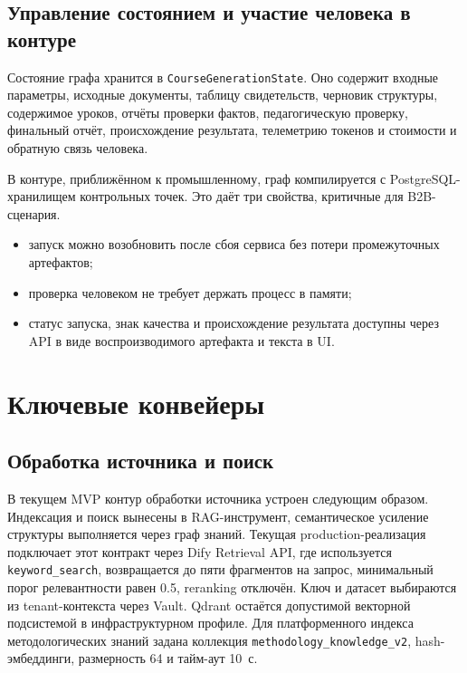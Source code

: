 \subsection{Управление состоянием и участие человека в контуре}

Состояние графа хранится в \texttt{CourseGenerationState}. Оно
содержит входные параметры, исходные документы, таблицу свидетельств,
черновик структуры, содержимое уроков, отчёты проверки фактов,
педагогическую проверку, финальный отчёт, происхождение результата,
телеметрию токенов и стоимости и обратную связь человека.

В контуре, приближённом к промышленному, граф компилируется с PostgreSQL-хранилищем контрольных точек.
Это даёт три свойства, критичные для B2B-сценария.

\begin{itemize}
  \item запуск можно возобновить после сбоя сервиса без потери
    промежуточных артефактов;
  \item проверка человеком не требует держать процесс в памяти;
  \item статус запуска, знак качества и происхождение результата доступны через API
    в виде воспроизводимого артефакта и текста в UI.
\end{itemize}

\section{Ключевые конвейеры}

\subsection{Обработка источника и поиск}

В текущем MVP контур обработки источника устроен следующим образом.
Индексация и поиск вынесены в RAG-инструмент,
семантическое усиление структуры выполняется через граф знаний.
Текущая production-реализация подключает этот контракт через Dify
Retrieval API, где используется \texttt{keyword\_search}, возвращается до
пяти фрагментов на запрос, минимальный порог релевантности равен
0.5, reranking отключён. Ключ и датасет выбираются из tenant-контекста
через Vault. Qdrant остаётся допустимой векторной подсистемой в
инфраструктурном профиле. Для платформенного индекса методологических
знаний задана коллекция \texttt{methodology\_knowledge\_v2}, hash-эмбеддинги,
размерность 64 и тайм-аут 10~с.


